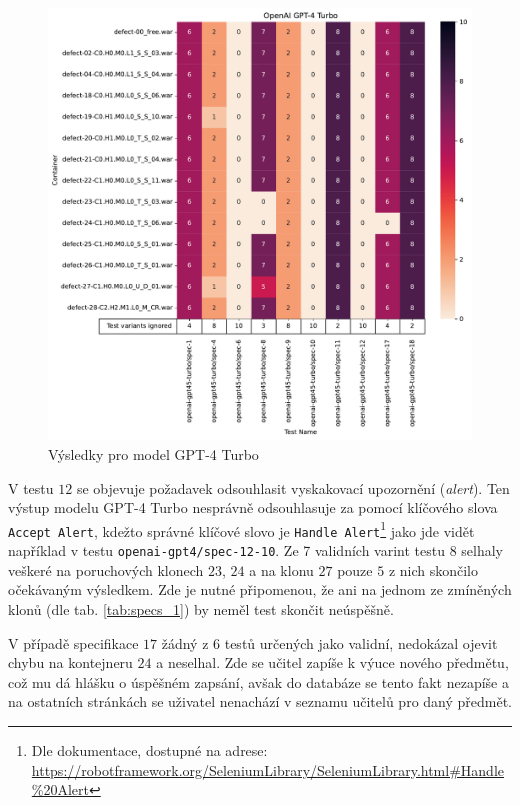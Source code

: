 \documentclass[czech, ma, kiv, he, iso690numb, pdf, viewonly]{fasthesis}
\begin{document}
            \begin{figure}
                \includegraphics[width=\textwidth]{pic/gpt-4-turbo-results.pdf}
                \caption{Výsledky pro model GPT-4 Turbo}
                \label{fig:res:gpt-4-turbo}
            \end{figure}

            V testu \(12\) se objevuje požadavek odsouhlasit vyskakovací upozornění (\textit{alert}). Ten výstup modelu GPT-4 Turbo nesprávně odsouhlasuje za pomocí klíčového slova \verb|Accept Alert|, kdežto správné klíčové slovo je \verb|Handle Alert|\footnote{Dle dokumentace, dostupné na adrese: \url{https://robotframework.org/SeleniumLibrary/SeleniumLibrary.html#Handle\%20Alert}} jako jde vidět například v testu \verb|openai-gpt4/spec-12-10|. Ze 7 validních varint testu \(8\) selhaly veškeré na poruchových klonech \(23\), \(24\) a na klonu \(27\) pouze \(5\) z nich skončilo očekávaným výsledkem. Zde je nutné připomenou, že ani na jednom ze zmíněných klonů (dle tab. \ref{tab:specs_1}) by neměl test skončit neúspěšně.

            V případě specifikace \(17\) žádný z 6 testů určených jako validní, nedokázal ojevit chybu na kontejneru \(24\) a neselhal. Zde se učitel zapíše k výuce nového předmětu, což mu dá hlášku o úspěšném zapsání, avšak do databáze se tento fakt nezapíše a na ostatních stránkách se uživatel nenachází v seznamu učitelů pro daný předmět.
\end{document}
